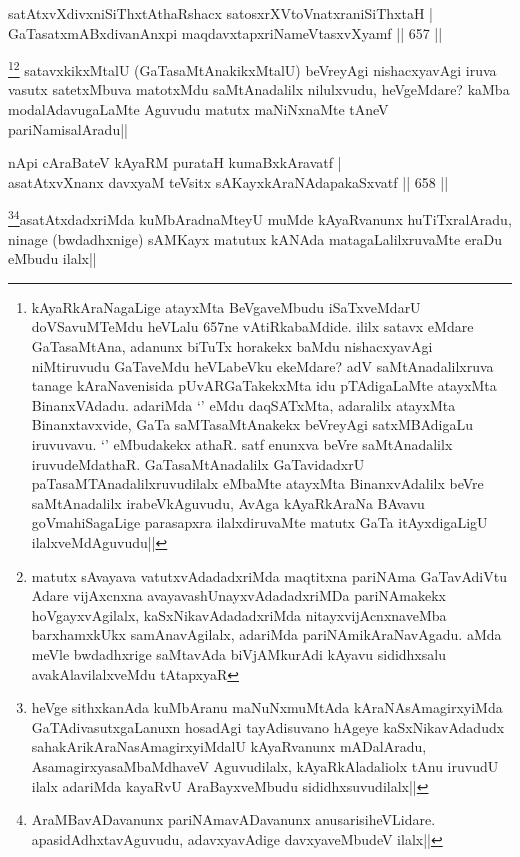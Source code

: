
\begin{shl}
satAtxvXdivxniSiThxtAthaRshacx satosxrXVtoVnatxraniSiThxtaH | \\
GaTasatxmABxdivanAnxpi maqdavxtapxriNameVtasxvXyamf \hfill||  657 ||  
\end{shl}

\begin{artha}
\footnote{kAyaRkAraNagaLige atayxMta BeVgaveMbudu iSaTxveMdarU doVSavuMTeMdu heVLalu 657ne vAtiRkabaMdide. ililx satavx eMdare GaTasaMtAna, adanunx biTuTx horakekx baMdu nishacxyavAgi niMtiruvudu GaTaveMdu heVLabeVku ekeMdare? adV saMtAnadalilxruva tanage kAraNavenisida pUvARGaTakekxMta idu pTAdigaLaMte atayxMta BinanxVAdadu. adariMda `\stext' eMdu daqSATxMta, adaralilx atayxMta Binanxtavxvide, GaTa saMTasaMtAnakekx beVreyAgi satxMBAdigaLu iruvuvavu. `\stext' eMbudakekx athaR. satf enunxva beVre saMtAnadalilx iruvudeMdathaR. GaTasaMtAnadalilx GaTavidadxrU paTasaMTAnadalilxruvudilalx eMbaMte atayxMta BinanxvAdalilx beVre saMtAnadalilx irabeVkAguvudu, AvAga kAyaRkAraNa BAvavu goVmahiSagaLige parasapxra ilalxdiruvaMte matutx GaTa itAyxdigaLigU ilalxveMdAguvudu||}\footnote{matutx sAvayava vatutxvAdadadxriMda maqtitxna pariNAma GaTavAdiVtu Adare vijAxcnxna avayavashUnayxvAdadadxriMDa pariNAmakekx hoVgayxvAgilalx, kaSxNikavAdadadxriMda nitayxvijAcnxnaveMba barxhamxkUkx samAnavAgilalx, adariMda pariNAmikAraNavAgadu. aMda meVle bwdadhxrige saMtavAda biVjAMkurAdi kAyavu sididhxsalu avakAlavilalxveMdu tAtapxyaR} satavxkikxMtalU (GaTasaMtAnakikxMtalU) beVreyAgi nishacxyavAgi iruva vasutx satetxMbuva matotxMdu saMtAnadalilx nilulxvudu, heVgeMdare? kaMba modalAdavugaLaMte Aguvudu matutx maNiNxnaMte tAneV pariNamisalAradu||
\end{artha}


\begin{shl}
nApi cA\s \s raBateV kAyaRM purataH kumaBxkAravatf | \\
asatAtxvXnanx davxyaM teV\s sitx sAKayxkAraNAdapakaSxvatf \hfill||  658 ||  
\end{shl}

\begin{artha}
\footnote{heVge sithxkanAda kuMbAranu maNuNxmuMtAda kAraNAsAmagirxyiMda GaTAdivasutxgaLanuxn hosadAgi tayAdisuvano hAgeye kaSxNikavAdadudx sahakArikAraNasAmagirxyiMdalU kAyaRvanunx mADalAradu, AsamagirxyasaMbaMdhaveV Aguvudilalx, kAyaRkAladaliolx tAnu iruvudU ilalx adariMda kayaRvU AraBayxveMbudu sididhxsuvudilalx||}\footnote{AraMBavADavanunx pariNAmavADavanunx anusarisiheVLidare. apasidAdhxtavAguvudu, adavxyavAdige davxyaveMbudeV ilalx||}asatAtxdadxriMda kuMbAradnaMteyU muMde kAyaRvanunx huTiTxralAradu, ninage (bwdadhxnige) sAMKayx matutux kANAda matagaLalilxruvaMte eraDu eMbudu ilalx||
\end{artha}

